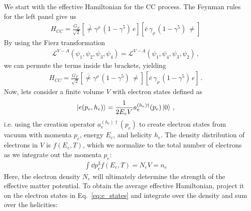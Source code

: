 We start with the effective Hamiltonian for the CC process. The Feynman rules for the left panel give us 
\begin{align}
    H_{CC} = \frac{G_F}{\sqrt{2}}\left[ \bar\ne \gamma^\rho\, (1- \gamma^5)\, e \right] \left[\bar e \,\gamma_\rho\, (1- \gamma^5)\, \ne \right]
\end{align}
By using the Fierz transformation 
\begin{align}
    \mathcal{L}^{V-A}(\psi_1,\psi_2,\psi_3,\psi_4) = \mathcal{L}^{V-A}(\psi_1,\psi_4,\psi_3,\psi_2)\,,
\end{align}
we can permute the terms inside the brackets, yielding
\begin{align}\label{eq:H_fierz}
    H_{CC} = \frac{G_F}{\sqrt{2}}\left[ \bar\ne \gamma^\rho\, (1- \gamma^5)\, \ne \right] \left[\bar e \,\gamma_\rho\, (1- \gamma^5)\, e \right]\,.
\end{align}
Now, lets consider a finite volume $V$ with electron states defined as 
\begin{align}\label{eq:e_states}
    \ket{e(p_e,h_e)} = \frac{1}{2E_eV}a_e^{(h_e)\dagger}(p_e)\ket{0}\,,
\end{align}
i.e. using the creation operator $a_e^{(h_e)\dagger}(p_e)$ to create electron states from vacuum with momenta $p_e$, energy $E_e$, and helicity $h_e$.
The density distribution of electrons in $V$ is $f(E_e,T)$, which we normalize to the total number of electrons as we integrate out the momenta $p_e$:
\begin{align}\label{eq:e_density}
    \int \dd p_e^3 f(E_e,T) = N_e V = n_e
\end{align}
Here, the electron density $N_e$ will ultimately determine the strength of the effective matter potential. 
To obtain the average effective Hamiltonian, project it on the electron states in Eq.~\ref{eq:e_states} and integrate over the density and sum over the helicities:

